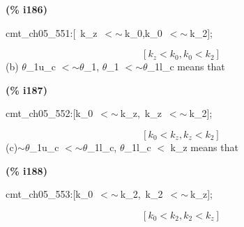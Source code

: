 \documentclass[fleqn]{article}
\begin{document}
\noindent
\begin{minipage}[t]{4.000000em}\color{red}\bfseries
(\% i186)	
\end{minipage}
\begin{minipage}[t]{\textwidth}\color{blue}
cmt\_ch05\_551:[\ k\_z\ \ensuremath{<}\ensuremath{\sim\ }k\_0,k\_0\ \ensuremath{<}\ensuremath{\sim\ }k\_2];
\end{minipage}
\[\displaystyle \tag{\% o186} 
\left[ {k_z}\operatorname{<  }{k_0}\operatorname{,}{k_0}\operatorname{<  }{k_2}\right] \mbox{}
\]
(b) \ensuremath{\theta}\_1u\_c \ensuremath{<}\ensuremath{\sim }\ensuremath{\theta}\_1, \ensuremath{\theta}\_1 \ensuremath{<}\ensuremath{\sim }\ensuremath{\theta}\_1l\_c means that


\noindent
\begin{minipage}[t]{4.000000em}\color{red}\bfseries
(\% i187)	
\end{minipage}
\begin{minipage}[t]{\textwidth}\color{blue}
cmt\_ch05\_552:[k\_0\ \ensuremath{<}\ensuremath{\sim\ }k\_z,\ k\_z\ \ensuremath{<}\ensuremath{\sim\ }k\_2];
\end{minipage}
\[\displaystyle \tag{\% o187} 
\left[ {k_0}\operatorname{<  }{k_z}\operatorname{,}{k_z}\operatorname{<  }{k_2}\right] \mbox{}
\]
(c)\ensuremath{\sim }\ensuremath{\theta}\_1u\_c \ensuremath{<}\ensuremath{\sim }\ensuremath{\theta}\_1l\_c, \ensuremath{\theta}\_1l\_c \ensuremath{<} k\_z means that


\noindent
\begin{minipage}[t]{4.000000em}\color{red}\bfseries
(\% i188)	
\end{minipage}
\begin{minipage}[t]{\textwidth}\color{blue}
cmt\_ch05\_553:[k\_0\ \ensuremath{<}\ensuremath{\sim\ }k\_2,\ k\_2\ \ensuremath{<}\ensuremath{\sim\ }k\_z];
\end{minipage}
\[\displaystyle \tag{\% o188} 
\left[ {k_0}\operatorname{<  }{k_2}\operatorname{,}{k_2}\operatorname{<  }{k_z}\right] \mbox{}
\]
\end{document}

